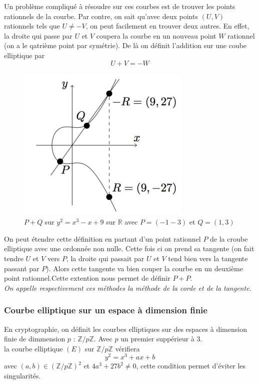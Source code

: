 \documentclass[a4paper, 12pt]{article}
\begin{document}
\label{methodecorde}Un problème compliqué à résoudre sur ces courbes est de trouver les points rationnels de la courbe. Par contre, on sait qu'avec deux points $(U, V)$ rationnels tels que $U \neq -V$, on peut facilement en trouver deux autres. En effet, la droite qui passe par $U$ et $V$ coupera la courbe en un nouveau point $W$ rationnel (on a le qatrième point par symétrie).
De là on définit l'addition sur une coube elliptique par 
$$
U + V = - W
$$

\begin{figure}[h]
	\centering
	\includegraphics[width=.5\textwidth]{img/courbe1op.png}
	\caption{$P + Q$ sur $y^2 = x^3 - x + 9$ sur $\mathbb{R}$ avec $P = (-1-3)$ et $Q = (1,3)$}
	\label{courbe1op}
\end{figure}


\label{methodetangente}On peut étendre cette définition en partant d'un point rationnel $P$ de la croube elliptique avec une ordonnée non nulle. Cette fois ci on prend sa tangente (on fait tendre $U$ et $V$ vers $P$, la droite qui passait par $U$ et $V$ tend bien vers la tangente passant par $P$). Alors cette tangente va bien couper la courbe en un deuxième point rationnel.Cette extention nous permet de définir $P+P$. \\

\noindent\emph{On appelle respectivement ces méthodes la méthode de la corde et de la tangente.}

\subsubsection{Courbe elliptique sur un espace à dimension finie}
En cryptographie, on définit les courbes elliptiques sur des espaces à dimension finie de dimmension $p$ : $\mathbb{Z}/p\mathbb{Z}$. Avec $p$ un premier suppérieur à 3. \\
la courbe elliptique $(E)$ sur $ \mathbb{Z}/p\mathbb{Z}$ vérifiera 
$$
y^2 = x^3 + ax + b
$$
avec $(a,b) \in \left(\mathbb{Z}/p\mathbb{Z}\right)^2$ et $4a^3 + 27b^2 \neq 0$, cette condition permet d'éviter les singularités. \\
\end{document}
